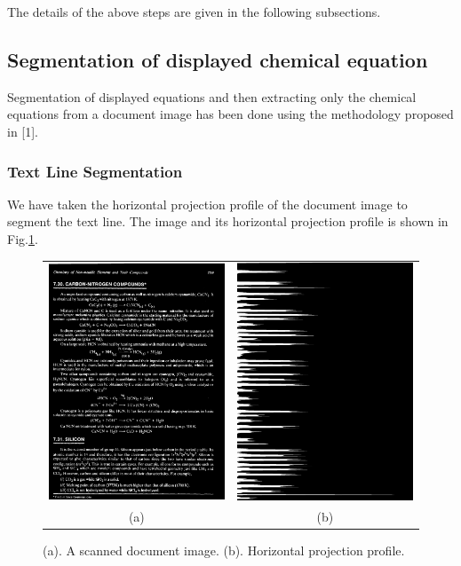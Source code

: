 \documentclass[conference]{IEEEtran}
\begin{document}
The details of the above steps are given in the following subsections.

\subsection{Segmentation of displayed chemical equation}

Segmentation of displayed equations and then extracting only the chemical equations from a document image has been done using the methodology proposed in [1]. 
\subsubsection{Text Line Segmentation}

We have taken the horizontal projection profile of the document image to segment
the text line. The image and its horizontal projection profile is shown in Fig.\ref{fig:line segmentation}.

\begin{figure}[!h]\center\footnotesize
\begin{tabular}{|c|c|}\hline
 \includegraphics[width=0.35\linewidth]{sample_img.png} &  
 \includegraphics[width=0.35\linewidth]{h_proj.png}\\ 
 (a)&(b)\\ \hline
 \end{tabular} 
 \caption{(a). A scanned document image. (b). Horizontal projection profile.}
 \label{fig:line segmentation}
\end{figure}
\end{document}
